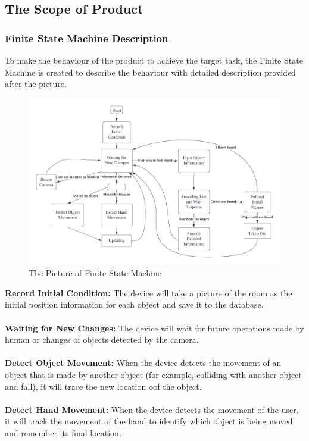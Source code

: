 \documentclass[12pt]{article}
\begin{document}
\subsection{The Scope of Product}
\subsubsection{Finite State Machine Description}
To make the behaviour of the product to achieve the target task, the Finite State Machine is created to describe the behaviour with detailed description provided after the picture. 
\begin{figure}[H]
    \centering
    \includegraphics[scale=0.7]{FSM.png}
    \caption{The Picture of Finite  State Machine}
\end{figure}
\textbf{Record Initial Condition:} The device will take a picture of the room as the initial position information for each object and save it to the database. \\\\
\textbf{Waiting for New Changes:} The device will wait for future operations made by human or changes of objects detected by the camera. \\\\
\textbf{Detect Object Movement:} When the device detects the movement of an object that is made by another object (for example, colliding with another object and fall), it will trace the new location oof the object. \\\\
\textbf{Detect Hand Movement:} When the device detects the movement of the user, it will track the movement of the hand to identify which object is being moved and remember its final location. \\\\
\end{document}
